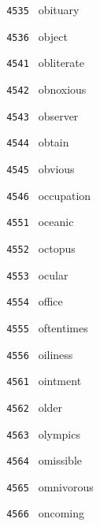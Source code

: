 \documentclass[11pt]{article}
\begin{document}
\begin{multicols}{6}
\noindent \texttt{ 4535 } \hspace{1mm} obituary  \par
\noindent \texttt{ 4536 } \hspace{1mm} object  \par
\noindent \texttt{ 4541 } \hspace{1mm} obliterate  \par
\noindent \texttt{ 4542 } \hspace{1mm} obnoxious  \par
\noindent \texttt{ 4543 } \hspace{1mm} observer  \par
\noindent \texttt{ 4544 } \hspace{1mm} obtain  \par
\noindent \texttt{ 4545 } \hspace{1mm} obvious  \par
\noindent \texttt{ 4546 } \hspace{1mm} occupation  \par
\noindent \texttt{ 4551 } \hspace{1mm} oceanic  \par
\noindent \texttt{ 4552 } \hspace{1mm} octopus  \par
\noindent \texttt{ 4553 } \hspace{1mm} ocular  \par
\noindent \texttt{ 4554 } \hspace{1mm} office  \par
\noindent \texttt{ 4555 } \hspace{1mm} oftentimes  \par
\noindent \texttt{ 4556 } \hspace{1mm} oiliness  \par
\noindent \texttt{ 4561 } \hspace{1mm} ointment  \par
\noindent \texttt{ 4562 } \hspace{1mm} older  \par
\noindent \texttt{ 4563 } \hspace{1mm} olympics  \par
\noindent \texttt{ 4564 } \hspace{1mm} omissible  \par
\noindent \texttt{ 4565 } \hspace{1mm} omnivorous  \par
\noindent \texttt{ 4566 } \hspace{1mm} oncoming  \par

\end{multicols}
\end{document}
